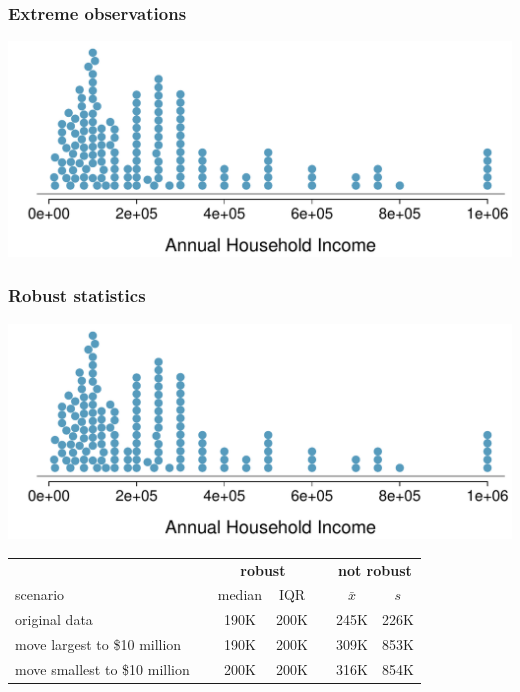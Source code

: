 
\begin{frame}
\frametitle{Extreme observations}


\begin{center}
\includegraphics[width=\textwidth]{1-6_numerical_data/figures/house_income/house_income_dot_stacked}
\end{center}

\end{frame}


\begin{frame}
\frametitle{Robust statistics}

\begin{center}
\includegraphics[width=\textwidth]{1-6_numerical_data/figures/house_income/house_income_dot_stacked}
\end{center}

{\small
\begin{center}
\begin{tabular}{l c cc c cc}
  \hline
& \hspace{0mm} & \multicolumn{2}{c}{\bf robust} & \hspace{2mm} & \multicolumn{2}{c}{\bf not robust} \\
scenario && median & IQR && $\bar{x}$ & $s$ \\ 
  \hline
original data && 190K & 200K && 245K & 226K \\ 
move largest to \$10 million && 190K & 200K && 309K & 853K \\ 
move smallest to \$10 million && 200K & 200K && 316K & 854K \\ 
   \hline
\end{tabular}
\end{center}
}

\end{frame}

